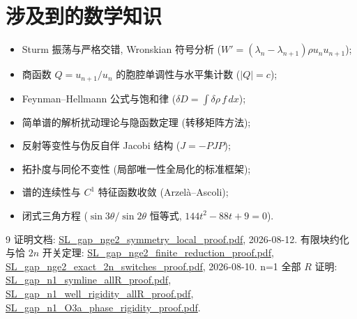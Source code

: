 \documentclass[UTF8]{ctexart}
\begin{document}
\section{涉及到的数学知识}

\begin{itemize}
	\item Sturm 振荡与严格交错, Wronskian 符号分析 ($W'=(\lambda_n-\lambda_{n+1})\rho u_nu_{n+1}$);
	\item 商函数 $Q=u_{n+1}/u_n$ 的胞腔单调性与水平集计数 ($|Q|=c$);
	\item Feynman--Hellmann 公式与饱和律 ($\delta D=\int\delta\rho\,f\,dx$);
	\item 简单谱的解析扰动理论与隐函数定理 (转移矩阵方法);
	\item 反射等变性与伪反自伴 Jacobi 结构 ($J=-PJP$);
	\item 拓扑度与同伦不变性 (局部唯一性全局化的标准框架);
	\item 谱的连续性与 $C^1$ 特征函数收敛 (Arzel\`a--Ascoli);
	\item 闭式三角方程 ($\sin3\theta/\sin2\theta$ 恒等式, $144t^2-88t+9=0$).
\end{itemize}

\begin{thebibliography}{9}
 证明文档: \url{SL_gap_nge2_symmetry_local_proof.pdf}, 2026-08-12.
 有限块约化与恰 $2n$ 开关定理:
\url{SL_gap_nge2_finite_reduction_proof.pdf}, \url{SL_gap_nge2_exact_2n_switches_proof.pdf}, 2026-08-10.
 n=1 全部 $R$ 证明: \url{SL_gap_n1_symline_allR_proof.pdf},
\url{SL_gap_n1_well_rigidity_allR_proof.pdf}, \url{SL_gap_n1_O3a_phase_rigidity_proof.pdf}.
\end{thebibliography}
\end{document}

